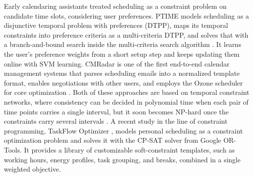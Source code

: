 \documentclass[runningheads]{llncs}
\begin{document}
Early calendaring assistants treated scheduling as a constraint problem on
candidate time slots, considering user preferences. PTIME models scheduling as a disjunctive temporal problem with preferences (DTPP), maps its temporal constraints into preference criteria as a multi-criteria DTPP, and solves that with a branch-and-bound search inside the multi-criteria search algorithm \citep{Berry2011PTIME:Calendaring}. It learns the user's preference weights from a short setup step and keeps updating them online with SVM learning. CMRadar is one of the first end-to-end calendar management
systems that parses scheduling emails into a normalized template format,
enables negotiations with other users, and employs the Ozone scheduler for core optimization \citep{Modi2005CMRadar:Management}. Both of these approaches are based on temporal constraint networks, where consistency can be decided in polynomial time when each pair of time points carries a single interval, but it soon becomes NP-hard once the constraints carry several intervals \citep{Dechter1991}. A recent study in the line of constraint programming, TaskFlow Optimizer \citep{cpsat}, models personal scheduling as a constraint optimization problem and solves it with the CP-SAT solver from Google OR-Tools. It provides a library of customizable soft-constraint templates, such as working hours, energy profiles, task grouping, and breaks, combined in a single weighted objective.

\end{document}

